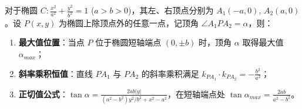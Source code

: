 \begin{statementbox}
对于椭圆 $C: \frac{x^2}{a^2} + \frac{y^2}{b^2} = 1$ ($a>b>0$)，其左、右顶点分别为 $A_1(-a, 0)$, $A_2(a, 0)$。设 $P(x, y)$ 为椭圆上除顶点外的任意一点，记顶角 $\angle A_1PA_2 = \alpha$，则：
\begin{enumerate}
    \item \textbf{最大值位置}：当点 $P$ 位于椭圆短轴端点 $(0, \pm b)$ 时，顶角 $\alpha$ 取得最大值 $\alpha_{max}$；
    \item \textbf{斜率乘积恒值}：直线 $PA_1$ 与 $PA_2$ 的斜率乘积满足 $k_{PA_1} \cdot k_{PA_2} = -\frac{b^2}{a^2}$；
    \item \textbf{正切值公式}：$\tan \alpha = \frac{2ab|y|}{(a^2-b^2)y^2/b^2 + x^2 - a^2}$，在短轴端点处 $\tan \alpha_{max} = \frac{2ab}{a^2-b^2}$。
\end{enumerate}
\end{statementbox}